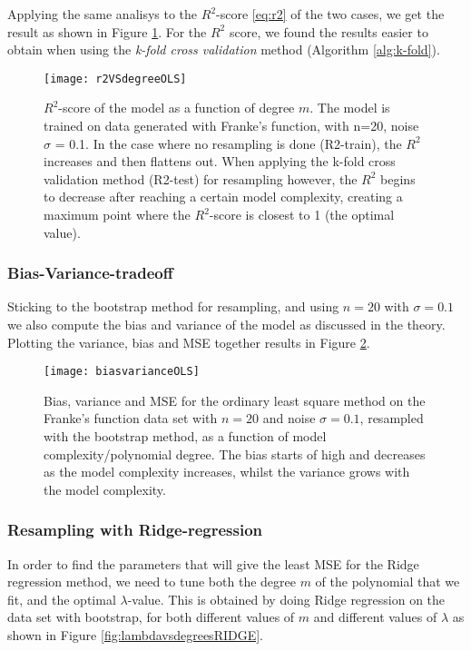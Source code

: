 Applying the same analisys to the $R^2$-score \eqref{eq:r2} of the two cases, we get the result as shown in Figure \ref{fig:r2VSdegreeOLS}. For the $R^2$ score, we found the results easier to obtain when using the \emph{k-fold cross validation} method (Algorithm \ref{alg:k-fold}).
\begin{figure}[htbp]
	\centering
	\texttt{[image: r2VSdegreeOLS]}
	\caption{$R^2$-score of the model as a function of degree $m$. The model is trained on data generated with Franke's function, with n=20, noise $\sigma$ = 0.1. In the case where no resampling is done (R2-train), the $R^2$ increases and then flattens out. When applying the k-fold cross validation method (R2-test) for resampling however, the $R^2$ begins to decrease after reaching a certain model complexity, creating a maximum point where the $R^2$-score is closest to 1 (the optimal value).}
	\label{fig:r2VSdegreeOLS}
\end{figure}

\subsubsection{Bias-Variance-tradeoff}
Sticking to the bootstrap method for resampling, and using $n=20$ with $\sigma = 0.1$ we also compute the bias and variance of the model as discussed in the theory. Plotting the variance, bias and MSE together results in Figure \ref{fig:biasvarianceOLS}.

\begin{figure}[htbp]
	\centering
	\texttt{[image: biasvarianceOLS]}
	\caption{Bias, variance and MSE for the ordinary least square method on the Franke's function data set with $n=20$ and noise $\sigma=0.1$, resampled with the bootstrap method, as a function of model complexity/polynomial degree. The bias starts of high and decreases as the model complexity increases, whilst the variance grows with the model complexity.}
	\label{fig:biasvarianceOLS}
\end{figure}

\subsubsection{Resampling with Ridge-regression}
In order to find the parameters that will give the least MSE for the Ridge regression method, we need to tune both the degree $m$ of the polynomial that we fit, and the optimal $\lambda$-value. This is obtained by doing Ridge regression on the data set with bootstrap, for both different values of $m$ and different values of $\lambda$ as shown in Figure \ref{fig:lambdavsdegreesRIDGE}.

